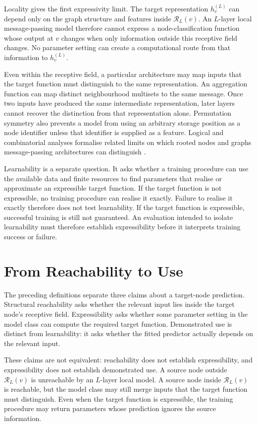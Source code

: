 Locality gives the first expressivity limit.
The target representation $h_v^{(L)}$ can depend only on the graph structure and features inside $\mathcal{R}_L(v)$.
An $L$-layer local message-passing model therefore cannot express a node-classification function whose output at $v$ changes when only information outside this receptive field changes.
No parameter setting can create a computational route from that information to $h_v^{(L)}$.

Even within the receptive field, a particular architecture may map inputs that the target function must distinguish to the same representation.
An aggregation function can map distinct neighbourhood multisets to the same message.
Once two inputs have produced the same intermediate representation, later layers cannot recover the distinction from that representation alone.
Permutation symmetry also prevents a model from using an arbitrary storage position as a node identifier unless that identifier is supplied as a feature.
Logical and combinatorial analyses formalise related limits on which rooted nodes and graphs message-passing architectures can distinguish \cite{barcelo2020logical}.

Learnability is a separate question.
It asks whether a training procedure can use the available data and finite resources to find parameters that realise or approximate an expressible target function.
If the target function is not expressible, no training procedure can realise it exactly.
Failure to realise it exactly therefore does not test learnability.
If the target function is expressible, successful training is still not guaranteed.
An evaluation intended to isolate learnability must therefore establish expressibility before it interprets training success or failure.

\section{From Reachability to Use}

The preceding definitions separate three claims about a target-node prediction.
Structural reachability asks whether the relevant input lies inside the target node's receptive field.
Expressibility asks whether some parameter setting in the model class can compute the required target function.
Demonstrated use is distinct from learnability: it asks whether the fitted predictor actually depends on the relevant input.

These claims are not equivalent: reachability does not establish expressibility, and expressibility does not establish demonstrated use.
A source node outside $\mathcal{R}_L(v)$ is unreachable by an $L$-layer local model.
A source node inside $\mathcal{R}_L(v)$ is reachable, but the model class may still merge inputs that the target function must distinguish.
Even when the target function is expressible, the training procedure may return parameters whose prediction ignores the source information.


